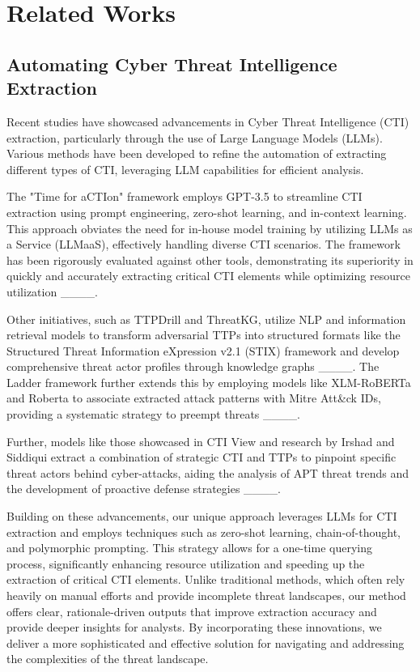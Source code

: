\section{Related Works}
\label{sec:relatedworks}
\subsection{Automating Cyber Threat Intelligence Extraction}
Recent studies have showcased advancements in Cyber Threat Intelligence (CTI) extraction, particularly through the use of Large Language Models (LLMs). Various methods have been developed to refine the automation of extracting different types of CTI, leveraging LLM capabilities for efficient analysis.

The "Time for aCTIon" framework employs GPT-3.5 to streamline CTI extraction using prompt engineering, zero-shot learning, and in-context learning. This approach obviates the need for in-house model training by utilizing LLMs as a Service (LLMaaS), effectively handling diverse CTI scenarios. The framework has been rigorously evaluated against other tools, demonstrating its superiority in quickly and accurately extracting critical CTI elements while optimizing resource utilization ____.

Other initiatives, such as TTPDrill and ThreatKG, utilize NLP and information retrieval models to transform adversarial TTPs into structured formats like the Structured Threat Information eXpression  v2.1 (STIX) framework and develop comprehensive threat actor profiles through knowledge graphs ____. The Ladder framework further extends this by employing models like XLM-RoBERTa and Roberta to associate extracted attack patterns with Mitre Att\&ck IDs, providing a systematic strategy to preempt threats ____.

Further, models like those showcased in CTI View and research by Irshad and Siddiqui extract a combination of strategic CTI and TTPs to pinpoint specific threat actors behind cyber-attacks, aiding the analysis of APT threat trends and the development of proactive defense strategies ____.

Building on these advancements, our unique approach leverages LLMs for CTI extraction and employs techniques such as zero-shot learning, chain-of-thought, and polymorphic prompting. This strategy allows for a one-time querying process, significantly enhancing resource utilization and speeding up the extraction of critical CTI elements. Unlike traditional methods, which often rely heavily on manual efforts and provide incomplete threat landscapes, our method offers clear, rationale-driven outputs that improve extraction accuracy and provide deeper insights for analysts. By incorporating these innovations, we deliver a more sophisticated and effective solution for navigating and addressing the complexities of the threat landscape.

